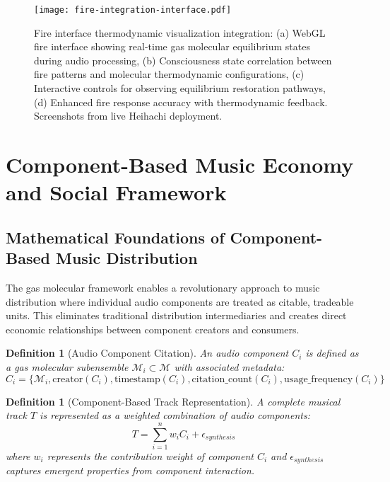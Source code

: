 \documentclass[12pt,a4paper]{article}
\newtheorem{definition}[theorem]{Definition}
\begin{document}
\begin{figure}[h]
\centering
\texttt{[image: fire-integration-interface.pdf]}
\caption{Fire interface thermodynamic visualization integration: (a) WebGL fire interface showing real-time gas molecular equilibrium states during audio processing, (b) Consciousness state correlation between fire patterns and molecular thermodynamic configurations, (c) Interactive controls for observing equilibrium restoration pathways, (d) Enhanced fire response accuracy with thermodynamic feedback. Screenshots from live Heihachi deployment.}
\label{fig:fire-integration-interface}
\end{figure}

\section{Component-Based Music Economy and Social Framework}

\subsection{Mathematical Foundations of Component-Based Music Distribution}

The gas molecular framework enables a revolutionary approach to music distribution where individual audio components are treated as citable, tradeable units. This eliminates traditional distribution intermediaries and creates direct economic relationships between component creators and consumers.

\begin{definition}[Audio Component Citation]
An audio component $C_i$ is defined as a gas molecular subensemble $\mathcal{M}_i \subset \mathcal{M}$ with associated metadata:
\begin{equation}
C_i = \{\mathcal{M}_i, \text{creator}(C_i), \text{timestamp}(C_i), \text{citation\_count}(C_i), \text{usage\_frequency}(C_i)\}
\end{equation}
\end{definition}

\begin{definition}[Component-Based Track Representation]
A complete musical track $T$ is represented as a weighted combination of audio components:
\begin{equation}
T = \sum_{i=1}^{n} w_i C_i + \epsilon_{synthesis}
\end{equation}
where $w_i$ represents the contribution weight of component $C_i$ and $\epsilon_{synthesis}$ captures emergent properties from component interaction.
\end{definition}
\end{document}
